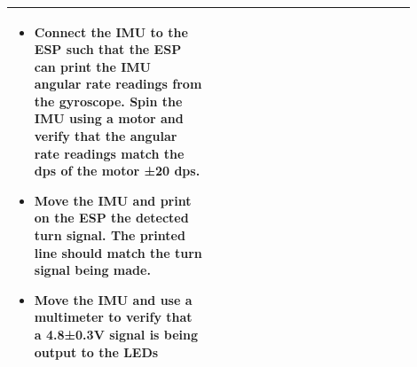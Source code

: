 \documentclass[12pt]{article}
\begin{document}
\begin{table}[h]
\begin{tabular}{p{0.45\linewidth}p{0.45\linewidth}}
\begin{itemize}[leftmargin=*, nosep, after=\strut]
            \item Connect the IMU to the ESP such that the ESP can print the IMU angular rate readings from the gyroscope. Spin the IMU using a motor and verify that the angular rate readings match the dps of the motor ±20 dps.
            \item Move the IMU and print on the ESP the detected turn signal. The printed line should match the turn signal being made.
            \item Move the IMU and use a multimeter to verify that a 4.8±0.3V signal is being output to the LEDs
        \end{itemize} \\
        \bottomrule
        \end{tabular}
        \end{table}
    \newpage
\end{document}
